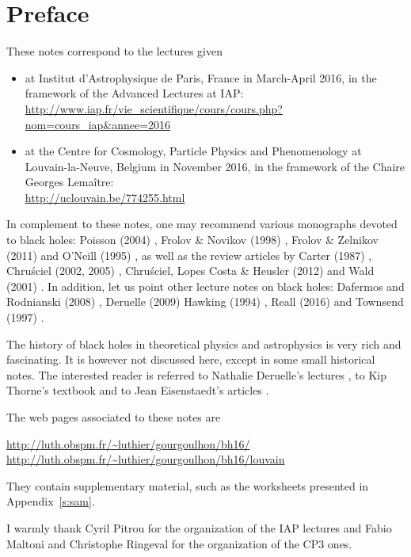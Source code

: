 \chapter*{Preface}

These notes correspond to the lectures given
\begin{itemize}
\item at
Institut d'Astrophysique de Paris, France in March-April 2016, in the
framework of the Advanced Lectures at IAP:\\
\url{http://www.iap.fr/vie_scientifique/cours/cours.php?nom=cours_iap&annee=2016}
\item at the Centre for Cosmology, Particle Physics and Phenomenology at Louvain-la-Neuve,
Belgium in November 2016, in the framework of the Chaire Georges Lemaître:\\
\url{http://uclouvain.be/774255.html}
\end{itemize}

\vspace{2ex}

In complement to these notes, one may recommend various monographs
devoted to black holes: Poisson (2004) \cite{Poiss04}, Frolov \& Novikov (1998) \cite{FroloN98},
Frolov \& Zelnikov (2011) \cite{FroloZ11} and O'Neill (1995) \cite{ONeil95}, as well as the review
articles by Carter (1987) \cite{Carte87}, Chru\'sciel (2002, 2005) \cite{Chrus02, Chrus05},
Chru\'sciel, Lopes Costa \& Heusler (2012) \cite{ChrusLH12} and Wald (2001) \cite{Wald01}.
In addition, let us point other lecture notes on black holes:
Dafermos and Rodnianski (2008) \cite{DaferR13},  Deruelle (2009) \cite{Derue09}
Hawking (1994) \cite{Hawki94,HawkiP15}, Reall (2016) \cite{Reall16} and Townsend (1997) \cite{Towns97}.

The history of black holes in theoretical physics and astrophysics is
very rich and fascinating. It is however not discussed here, except in some
small historical notes. The interested
reader is referred to Nathalie Deruelle's lectures \cite{Derue09}, to Kip Thorne's
textbook \cite{Thorn94} and to Jean Eisenstaedt's articles \cite{Eisen82,Eisen93}.


The web pages associated to these notes are

\begin{center}
\url{http://luth.obspm.fr/~luthier/gourgoulhon/bh16/}\\
\url{http://luth.obspm.fr/~luthier/gourgoulhon/bh16/louvain}
\end{center}

They contain supplementary material, such as the worksheets presented in
Appendix~\ref{s:sam}.

\vspace{2ex}

I warmly thank Cyril Pitrou for the organization of the IAP lectures
and Fabio Maltoni and Christophe Ringeval for the organization of the CP3 ones.
